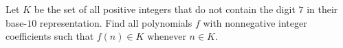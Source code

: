 Let $K$ be the set of all positive integers that do not contain the digit $7$ in their base-$10$ representation. Find all polynomials $f$ with nonnegative integer coefficients such that $f(n)\in K$ whenever $n\in K$.